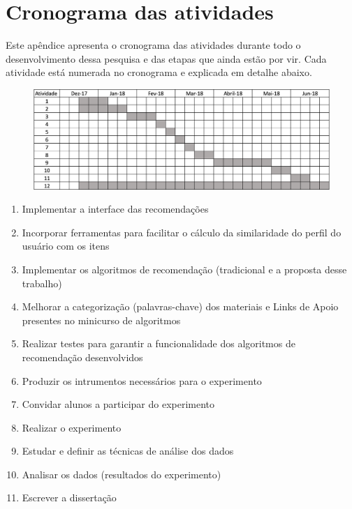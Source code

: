 \chapter{Cronograma das atividades}\label{ape:cronograma}

Este apêndice apresenta o cronograma das atividades durante todo o desenvolvimento dessa pesquisa e das etapas que ainda
estão por vir. Cada atividade está numerada no cronograma e explicada em detalhe abaixo.

\begin{figure}[htb]
  \begin{center}
      \includegraphics[scale=0.45]{./Figuras/cronograma.png}
  \end{center}
\end{figure}

\begin{enumerate}
\item Implementar a interface das recomendações
\item Incorporar ferramentas para facilitar o cálculo da similaridade do perfil do usuário com os itens
\item Implementar os algoritmos de recomendação (tradicional e a proposta desse trabalho)
\item Melhorar a categorização (palavras-chave) dos materiais e Links de Apoio presentes no minicurso de algoritmos
\item Realizar testes para garantir a funcionalidade dos algoritmos de recomendação desenvolvidos
\item Produzir os intrumentos necessários para o experimento
\item Convidar alunos a participar do experimento
\item Realizar o experimento
\item Estudar e definir as técnicas de análise dos dados
\item Analisar os dados (resultados do experimento)
\item Escrever a dissertação
\end{enumerate}
